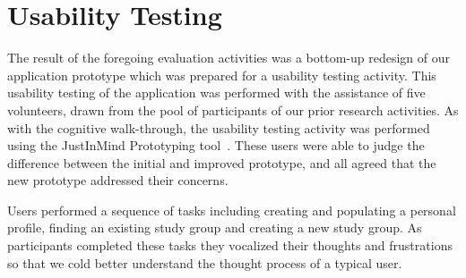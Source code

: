 \documentclass{sigchi-ext}
\begin{document}
\section{Usability Testing}

The result of the foregoing evaluation activities was a bottom-up redesign of
our application prototype which was prepared for a usability testing activity.
This usability testing of the application was performed with the assistance of
five volunteers, drawn from the pool of participants of our prior research
activities. As with the cognitive walk-through, the usability testing activity
was performed using the JustInMind Prototyping tool~\cite{justinmind}.  These
users were able to judge the difference between the initial and improved
prototype, and all agreed that the new prototype addressed their concerns.

Users performed a sequence of tasks including creating and populating a
personal profile, finding an existing study group and creating a new study
group. As participants completed these tasks they vocalized their thoughts and
frustrations so that we cold better understand the thought process of a typical
user.


\end{document}
